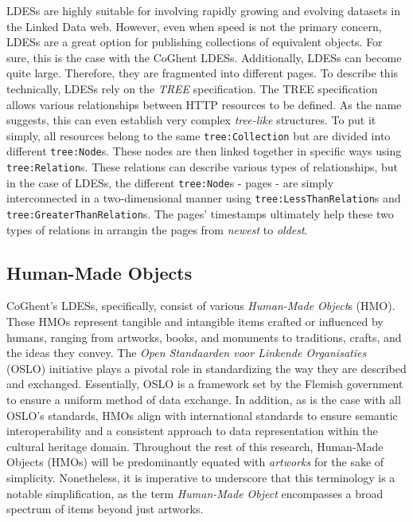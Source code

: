 LDESs are highly suitable for involving rapidly growing and evolving datasets in the Linked Data web. However, even when speed is not the primary concern, LDESs are a great option for publishing collections of equivalent objects. For sure, this is the case with the CoGhent LDESs. Additionally, LDESs can become quite large. Therefore, they are fragmented into different pages. To describe this technically, LDESs rely on the \textit{TREE} specification. The TREE specification allows various relationships between HTTP resources to be defined. As the name suggests, this can even establish very complex \textit{tree-like} structures. To put it simply, all resources belong to the same \texttt{tree:Collection} but are divided into different \texttt{tree:Node}s. These nodes are then linked together in specific ways using \texttt{tree:Relation}s. These relations can describe various types of relationships, but in the case of LDESs, the different \texttt{tree:Node}s - pages - are simply interconnected in a two-dimensional manner using \texttt{tree:LessThanRelation}s and \texttt{tree:GreaterThanRelation}s. The pages' timestamps ultimately help these two types of relations in arrangin the pages from \textit{newest} to \textit{oldest}. \citep{colpaert2023ldes} \citep{colpaert2023tree}

\subsection{Human-Made Objects}

CoGhent's LDESs, specifically, consist of various \textit{Human-Made Object}s (HMO). These HMOs represent tangible and intangible items crafted or influenced by humans, ranging from artworks, books, and monuments to traditions, crafts, and the ideas they convey. The \textit{Open Standaarden voor Linkende Organisaties} (OSLO) initiative plays a pivotal role in standardizing the way they are described and exchanged. Essentially, OSLO is a framework set by the Flemish government to ensure a uniform method of data exchange. In addition, as is the case with all OSLO's standards, HMOs align with international standards to ensure semantic interoperability and a consistent approach to data representation within the cultural heritage domain. Throughout the rest of this research, Human-Made Objects (HMOs) will be predominantly equated with \textit{artworks} for the sake of simplicity. Nonetheless, it is imperative to underscore that this terminology is a notable simplification, as the term \textit{Human-Made Object} encompasses a broad spectrum of items beyond just artworks. \citep{van2022publishing} \citep{vanderperren2021oslo} \citep{linden2021object}

